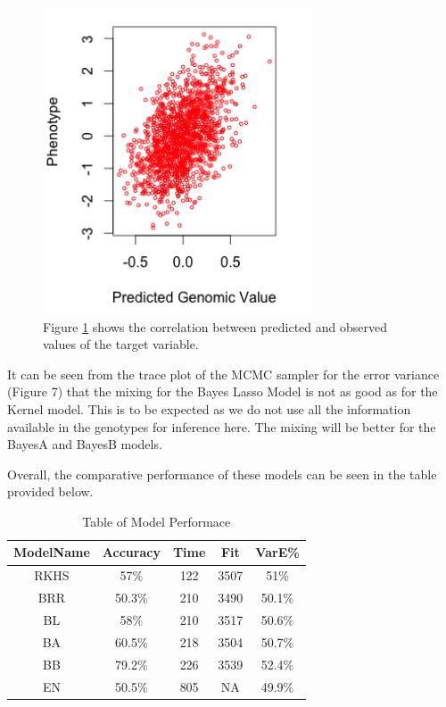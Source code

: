 \documentclass{sig-alternate-05-2015}
\begin{document}
\begin{figure}
  \includegraphics[width=8cm]{./Images/BLplot1.png}
  \centering
  \caption{Figure \ref{fig:corrgen} shows the correlation between predicted and observed values of the target variable.}
  \label{fig:corrgen}
\end{figure}

It can be seen from the trace plot of the MCMC sampler for the error variance (Figure 7) that the mixing for the Bayes Lasso Model is not as good as for the
Kernel model. This is to be expected as we do not use all the information available in the genotypes for inference here. The mixing will be better
for the BayesA and BayesB models.

Overall, the comparative performance of these models can be seen in the table provided below.

\begin{table}[h!]
\centering
 \begin{tabular}{||c c c c c||}
 \hline
 ModelName & Accuracy & Time	& Fit	& VarE\% \\
 \hline
  RKHS & 57\%	& 122	& 3507	& 51\% \\
 \hline
 BRR & 50.3\%	& 210	& 3490	& 50.1\% \\
 \hline
 BL	& 58\%	& 210	& 3517	& 50.6\% \\
 \hline
 BA	& 60.5\%	& 218 & 3504 & 50.7\% \\
 \hline
 BB	& 79.2\%	& 226	& 3539 & 52.4\% \\
 \hline
 EN	& 50.5\%	& 805 &	NA	& 49.9\% \\
 \hline
\end{tabular}
\caption{Table of Model Performace}
\label{table:1}
\end{table}
\end{document}
